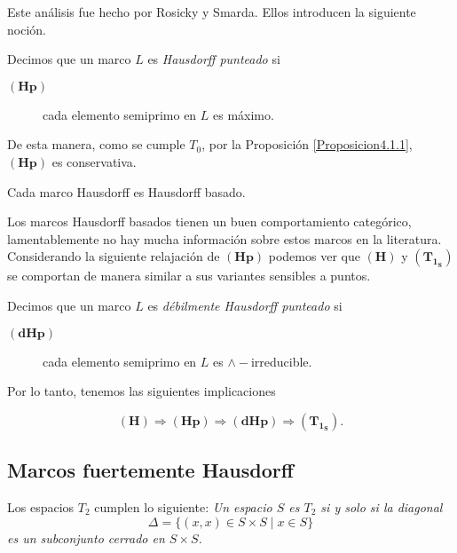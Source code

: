 Este análisis fue hecho por Rosicky y Smarda. Ellos introducen la siguiente noción.

\begin{dfn}
    Decimos que un marco $L$ es \emph{Hausdorff punteado} si     
    \begin{description}
        \item[$\mathbf{(Hp)}$] cada elemento semiprimo en $L$ es máximo. 
    \end{description}
\end{dfn}

De esta manera, como se cumple $T_0$, por la Proposición \ref{Proposicion4.1.1}, $\mathbf{(Hp)}$ es conservativa.

\begin{prop}\label{Proposición4.2}
    Cada marco Hausdorff es Hausdorff basado.
\end{prop}

Los marcos Hausdorff basados tienen un buen comportamiento categórico, lamentablemente no hay mucha información sobre estos marcos en la literatura.\\

Considerando la siguiente relajación de $\mathbf{(Hp)}$ podemos ver que $\mathbf{(H)}$ y $\mathbf{(T_{1_S})}$ se comportan de manera similar a sus variantes sensibles a puntos.

\begin{dfn}\label{DHausdorffbasado}
    Decimos que un marco $L$ es \emph{débilmente Hausdorff punteado} si
    \begin{description}
        \item[$\mathbf{(dHp)}$] cada elemento semiprimo en $L$ es $\wedge-$irreducible. 
    \end{description}
\end{dfn}

Por lo tanto, tenemos las siguientes implicaciones

\[
\mathbf{(H)}\Rightarrow \mathbf{(Hp)}\Rightarrow \mathbf{(dHp)}\Rightarrow \mathbf{(T_{1_S})}.
\]

\subsection{Marcos fuertemente Hausdorff}

Los espacios $T_2$ cumplen lo siguiente: \emph{Un espacio $S$ es $T_2$ si y solo si la diagonal 
\[
\Delta=\{(x,x)\in S\times S\mid x\in S\}
\]
es un subconjunto cerrado en $S\times S$.}\\

